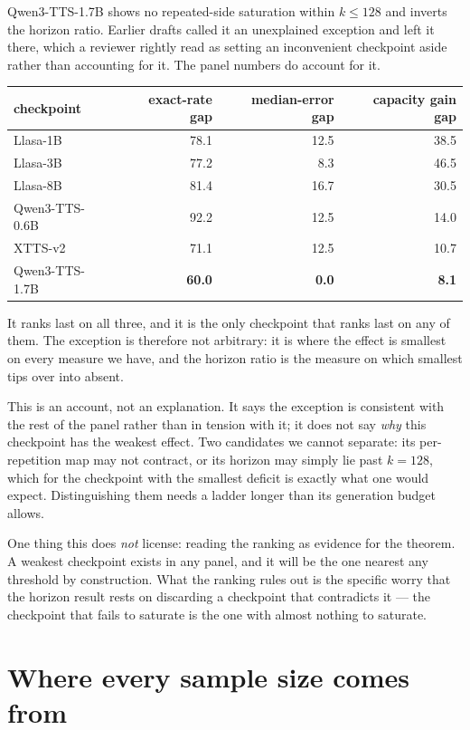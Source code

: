 \documentclass[11pt]{article}
\begin{document}
Qwen3-TTS-1.7B shows no repeated-side saturation within $k\le128$ and inverts the
horizon ratio. Earlier drafts called it an unexplained exception and left it
there, which a reviewer rightly read as setting an inconvenient checkpoint aside
rather than accounting for it. The panel numbers do account for it.

\begin{center}
\begin{tabular}{lrrr}
\toprule
checkpoint & exact-rate gap & median-error gap & capacity gain gap \\
\midrule
Llasa-1B        & 78.1 & 12.5 & 38.5 \\
Llasa-3B        & 77.2 &  8.3 & 46.5 \\
Llasa-8B        & 81.4 & 16.7 & 30.5 \\
Qwen3-TTS-0.6B  & 92.2 & 12.5 & 14.0 \\
XTTS-v2         & 71.1 & 12.5 & 10.7 \\
Qwen3-TTS-1.7B  & \textbf{60.0} & \textbf{0.0} & \textbf{8.1} \\
\bottomrule
\end{tabular}
\end{center}

\noindent It ranks last on all three, and it is the only checkpoint that ranks
last on any of them. The exception is therefore not arbitrary: it is where the
effect is smallest on every measure we have, and the horizon ratio is the measure
on which smallest tips over into absent.

This is an account, not an explanation. It says the exception is consistent with
the rest of the panel rather than in tension with it; it does not say \emph{why}
this checkpoint has the weakest effect. Two candidates we cannot separate: its
per-repetition map may not contract, or its horizon may simply lie past $k=128$,
which for the checkpoint with the smallest deficit is exactly what one would
expect. Distinguishing them needs a ladder longer than its generation budget
allows.

One thing this does \emph{not} license: reading the ranking as evidence for the
theorem. A weakest checkpoint exists in any panel, and it will be the one nearest
any threshold by construction. What the ranking rules out is the specific worry
that the horizon result rests on discarding a checkpoint that contradicts it ---
the checkpoint that fails to saturate is the one with almost nothing to saturate.


\section{Where every sample size comes from}
\end{document}
